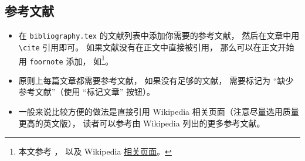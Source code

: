 \subsection{参考文献}
\begin{itemize}
\item 在 \verb|bibliography.tex| 的文献列表中添加你需要的参考文献， 然后在文章中用 \verb|\cite| 引用即可。 如果文献没有在正文中直接被引用， 那么可以在正文开始用 \verb|foornote| 添加， 如\footnote{本文参考 \cite{GriffE}， \cite{GriffQ} 以及 Wikipedia \href{https://www.wikipedia.org/}{相关页面}。}。
\item 原则上每篇文章都需要参考文献， 如果没有足够的文献， 需要标记为 “缺少参考文献”（使用 “标记文章” 按钮）。
\item 一般来说比较方便的做法是直接引用 Wikipedia 相关页面（注意尽量选用质量更高的英文版）， 读者可以参考由 Wikipedia 列出的更多参考文献。
\end{itemize}
